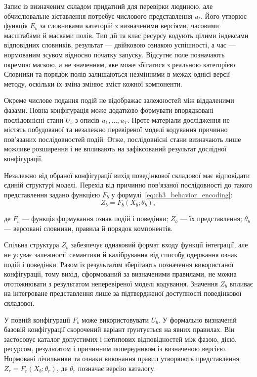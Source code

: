 Запис із визначеним складом придатний для перевірки людиною, але обчислювальне зіставлення потребує числового представлення $u_t$. Його утворює функція $E_b$ за словниками категорій з визначеними версіями, часовими масштабами й масками полів. Тип дії та клас ресурсу кодують цілими індексами відповідних словників, результат --- двійковою ознакою успішності, а час --- нормованим зсувом відносно початку запуску. Відсутнє поле позначають окремою маскою, а не значенням, яке може збігатися з реальною категорією. Словники та порядок полів залишаються незмінними в межах однієї версії методу, оскільки їх зміна змінює зміст кожної компоненти.

Окреме числове подання подій не відображає залежностей між віддаленими фазами. Повна конфігурація може додатково формувати впорядковані послідовнісні стани $U_b$ з описів $u_1,\ldots,u_T$. Проте матеріали дослідження не містять побудованої та незалежно перевіреної моделі кодування причинно пов’язаних послідовностей подій. Отже, послідовнісні стани визначають лише можливе розширення і не впливають на зафіксований результат дослідної конфігурації.

Незалежно від обраної конфігурації вихід поведінкової складової має відповідати єдиній структурі моделі. Перехід від причинно пов’язаної послідовності до такого представлення задано функцією $F_b$ у формулі~\eqref{eq:ch3_behavior_encoding}:
\begin{equation}
Z_b=F_b(X_b;\theta_b),
\label{eq:ch3_behavior_encoding}
\end{equation}

де $F_b$ --- функція формування ознак подій і поведінки; $Z_b$ --- їх представлення; $\theta_b$ --- версовані словники, правила й порядок компонентів.

Спільна структура $Z_b$ забезпечує однаковий формат входу функції інтеграції, але не усуває залежності семантики й калібрування від способу одержання ознак подій і поведінки. Разом із результатом зберігають позначення використаної конфігурації, тому вихід, сформований за визначеними правилами, не можна ототожнювати з результатом неперевіреної моделі кодування. Значення $Z_b$ впливає на інтегроване представлення лише за підтвердженої доступності поведінкової складової.

У повній конфігурації $F_b$ може використовувати $U_b$. У формально визначеній базовій конфігурації скорочений варіант ґрунтується на явних правилах. Він застосовує каталог допустимих і нетипових відповідностей між фазою, дією, ресурсом, результатом і причинним попередником із визначеною версією. Нормовані лічильники та ознаки виконання правил утворюють представлення $Z_r=F_r(X_b;\theta_r)$, де $\theta_r$ позначає версію каталогу.

